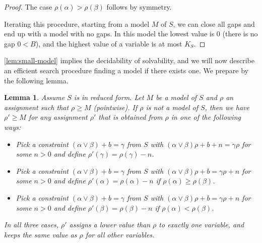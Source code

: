 \documentclass[11pt,a4paper]{article}
\newtheorem{lemma}{Lemma}[theorem]
\begin{document}
\begin{proof}
The case $\rho(\alpha) > \rho(\beta)$ follows by symmetry.

Iterating this procedure, starting from a model $M$ of $S$,
we can close all gaps and end up with a model with no gaps.
In this model the lowest value is $0$ (there is no gap $0<B$),
and the highest value of a variable is at most $K_S$.
\end{proof}

\cref{lem:small-model} implies the decidability of solvability,
and we will now describe an efficient search procedure finding a
model if there exists one. We prepare by the following lemma.

\begin{lemma}\label{lem:model-search}
Assume $S$ is in reduced form.
Let $M$ be a model of $S$ and $\rho$ an assignment such that $\rho\geq M$ (pointwise).
If $\rho$ is not a model of $S$, then we have $\rho'\geq M$ for any assignment $\rho'$
that is obtained from $\rho$ in one of the following ways:
\begin{itemize}
\item Pick a constraint $(\alpha\vee\beta)+b = \gamma$ from $S$ with
$(\alpha\vee\beta)\rho +b+n = \gamma\rho$ for some $n>0$ and
define $\rho'(\gamma) = \rho(\gamma)-n$.
\item Pick a constraint $(\alpha\vee\beta)+b = \gamma$ from $S$ with
$(\alpha\vee\beta)\rho +b = \gamma\rho + n$ for some $n>0$ and
define $\rho'(\alpha) = \rho(\alpha)-n$ if $\rho(\alpha)\geq\rho(\beta)$.
\item Pick a constraint $(\alpha\vee\beta)+b = \gamma$ from $S$ with
$(\alpha\vee\beta)\rho +b = \gamma\rho + n$ for some $n>0$ and
define $\rho'(\beta) = \rho(\beta)-n$ if $\rho(\alpha)<\rho(\beta)$.
\end{itemize}
In all three cases, $\rho'$ assigns a lower value than $\rho$ to exactly one variable,
and keeps the same value as $\rho$ for all other variables.
\end{lemma}
\end{document}

